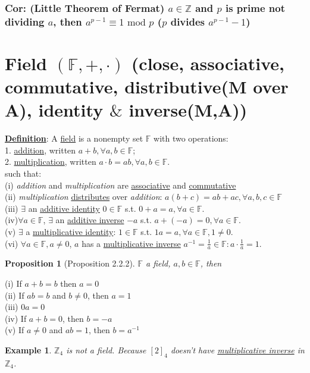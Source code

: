 \documentclass[11pt,a4paper]{article}
\newtheorem{proposition}{Proposition}
\newtheorem{example}{Example}
\begin{document}
\subsubsection{Cor: (Little Theorem of Fermat) $a\in \mathbb{Z}$ and $p$ is prime not dividing $a$, then $a^{p-1}\equiv 1 \text{ mod } p$ ($p$ divides $a^{p-1}-1$)}

\section{Field $(\mathbb{F}, +, \cdot)$ (close, associative, commutative, distributive(M over A), identity $\&$ inverse(M,A))}
\textbf{\underline{Definition}}: A \underline{field} is a nonempty set $\mathbb{F}$ with two operations:\\
1. \underline{addition}, written $a+b, \forall a,b\in\mathbb{F}$; \\
2. \underline{multiplication}, written $a\cdot b=ab, \forall a,b\in\mathbb{F}$.\\
such that:\\
(i) \textit{addition} and \textit{multiplication} are \underline{associative} and \underline{commutative}\\
(ii) \textit{multiplication} \underline{distributes} over \textit{addition}: $a(b+c)=ab+ac, \forall a,b,c\in\mathbb{F}$\\
(iii) $\exists$ an \underline{additive identity} $0\in \mathbb{F}$ s.t. $0+a=a, \forall a\in \mathbb{F}$.\\
(iv)$\forall a\in\mathbb{F}$, $\exists$ an \underline{additive inverse} $-a$ s.t. $a+(-a)=0, \forall a\in\mathbb{F}$.\\
(v) $\exists$ a \underline{multiplicative identity}: $1\in\mathbb{F}$ s.t. $1a=a, \forall a\in\mathbb{F}, 1\neq 0$.\\
(vi) $\forall a\in\mathbb{F}, a\neq 0$, $a$ has a \underline{multiplicative inverse} $a^{-1}=\frac{1}{a}\in\mathbb{F}: a\cdot\frac{1}{a}=1$.
\begin{proposition}[Proposition 2.2.2]
$\mathbb{F}$ a field, $a,b\in\mathbb{F}$, then
\end{proposition}
(i) If $a + b = b$ then $a = 0$\\
(ii) If $ab = b$ and $b \neq 0$, then $a = 1$\\
(iii) $0a = 0$\\
(iv) If $ a + b = 0$, then $b = -a$\\
(v) If $a \neq 0$ and $ab = 1$, then $b = a^{-1}$\\
\begin{example}
$\mathbb{Z}_4$ is not a field. Because $[2]_4$ doesn't have \underline{multiplicative inverse} in $\mathbb{Z}_4$.
\end{example}
\end{document}
